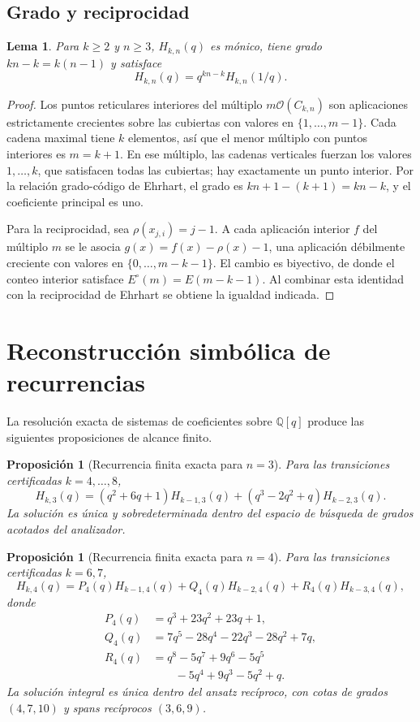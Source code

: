 \documentclass[11pt,a4paper]{article}
\newtheorem{lemma}[theorem]{Lema}
\newtheorem{proposition}[theorem]{Proposición}
\theoremstyle{definition}
\begin{document}
\subsection{Grado y reciprocidad}\label{sec:estructura}

\begin{lemma}\label{lem:estructura}
Para $k\ge2$ y $n\ge3$, $H_{k,n}(q)$ es mónico, tiene grado $kn-k=k(n-1)$ y satisface
\[
H_{k,n}(q)=q^{kn-k}H_{k,n}(1/q).
\]
\end{lemma}

\begin{proof}
Los puntos reticulares interiores del múltiplo $m\mathcal O(C_{k,n})$ son aplicaciones estrictamente crecientes sobre las cubiertas con valores en $\{1,\ldots,m-1\}$. Cada cadena maximal tiene $k$ elementos, así que el menor múltiplo con puntos interiores es $m=k+1$. En ese múltiplo, las cadenas verticales fuerzan los valores $1,\ldots,k$, que satisfacen todas las cubiertas; hay exactamente un punto interior. Por la relación grado-código de Ehrhart, el grado es $kn+1-(k+1)=kn-k$, y el coeficiente principal es uno.

Para la reciprocidad, sea $\rho(x_{j,i})=j-1$. A cada aplicación interior $f$ del múltiplo $m$ se le asocia $g(x)=f(x)-\rho(x)-1$, una aplicación débilmente creciente con valores en $\{0,\ldots,m-k-1\}$. El cambio es biyectivo, de donde el conteo interior satisface $E^\circ(m)=E(m-k-1)$. Al combinar esta identidad con la reciprocidad de Ehrhart se obtiene la igualdad indicada.
\end{proof}

\section{Reconstrucción simbólica de recurrencias}

La resolución exacta de sistemas de coeficientes sobre $\mathbb Q[q]$ produce las siguientes proposiciones de alcance finito.

\begin{proposition}[Recurrencia finita exacta para $n=3$]
\label{prop:rec-n3}
Para las transiciones certificadas $k=4,\ldots,8$,
\[
H_{k,3}(q)=(q^2+6q+1)H_{k-1,3}(q)
+(q^3-2q^2+q)H_{k-2,3}(q).
\]
La solución es única y sobredeterminada dentro del espacio de búsqueda de grados acotados del analizador.
\end{proposition}

\begin{proposition}[Recurrencia finita exacta para $n=4$]
\label{prop:rec-n4}
Para las transiciones certificadas $k=6,7$,
\[
H_{k,4}(q)=P_4(q)H_{k-1,4}(q)+Q_4(q)H_{k-2,4}(q)+R_4(q)H_{k-3,4}(q),
\]
donde
\begin{align*}
P_4(q)&=q^3+23q^2+23q+1,\\
Q_4(q)&=7q^5-28q^4-22q^3-28q^2+7q,\\
R_4(q)&=q^8-5q^7+9q^6-5q^5\\
&\qquad{}-5q^4+9q^3-5q^2+q.
\end{align*}
La solución integral es única dentro del ansatz recíproco, con cotas de grados $(4,7,10)$ y spans recíprocos $(3,6,9)$.
\end{proposition}
\end{document}
